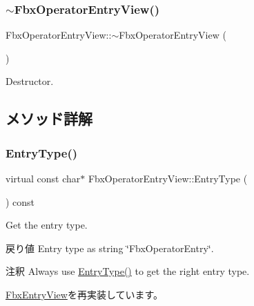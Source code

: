 \subsubsection{\texorpdfstring{$\sim$\+Fbx\+Operator\+Entry\+View()}{~FbxOperatorEntryView()}}
{\footnotesize\ttfamily Fbx\+Operator\+Entry\+View\+::$\sim$\+Fbx\+Operator\+Entry\+View (\begin{DoxyParamCaption}{ }\end{DoxyParamCaption})}



Destructor. 



\subsection{メソッド詳解}
\mbox{\label{class_fbx_operator_entry_view_a7821c1bf43a30e4c8ba054c66f051ad0}} 
\subsubsection{\texorpdfstring{Entry\+Type()}{EntryType()}}
{\footnotesize\ttfamily virtual const char$\ast$ Fbx\+Operator\+Entry\+View\+::\+Entry\+Type (\begin{DoxyParamCaption}{ }\end{DoxyParamCaption}) const\hspace{0.3cm}{\ttfamily [virtual]}}

Get the entry type. \begin{DoxyReturn}{戻り値}
Entry type as string \char`\"{}\+Fbx\+Operator\+Entry\char`\"{}. 
\end{DoxyReturn}
\begin{DoxyRemark}{注釈}
Always use \hyperlink{class_fbx_operator_entry_view_a7821c1bf43a30e4c8ba054c66f051ad0}{Entry\+Type()} to get the right entry type. 
\end{DoxyRemark}


\hyperlink{class_fbx_entry_view_a83ee50482b441ba8b0e6d7c2dba5432f}{Fbx\+Entry\+View}を再実装しています。

\mbox{\label{class_fbx_operator_entry_view_a7ce91f3c0d933aa9bb0ad8b9c1f82c32}} 
